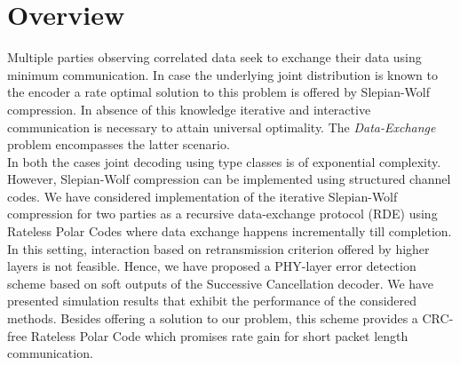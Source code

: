 \documentclass[
11pt, %
a4paper, %
oneside, %
headinclude,footinclude, %
BCOR5mm, %
]{scrartcl}
\begin{document}
\section*{Overview}
Multiple parties observing correlated data seek to exchange their data using minimum communication. In case the underlying joint distribution is known to the encoder a rate optimal solution to this problem is offered by Slepian-Wolf compression. In absence of this knowledge iterative and interactive communication is necessary to attain universal optimality. The \emph{Data-Exchange} problem  encompasses the latter scenario. \\In both the cases joint decoding using type classes is of exponential complexity. However, Slepian-Wolf compression can be implemented using structured channel codes. We have considered implementation of the iterative Slepian-Wolf compression for two parties as a recursive data-exchange protocol (RDE)  using Rateless Polar Codes where data exchange happens incrementally till completion. \\In this setting, interaction based on retransmission criterion offered by higher layers is not feasible.
Hence, we have  proposed a PHY-layer error detection scheme based on soft outputs of the Successive Cancellation decoder. We have presented simulation results that exhibit the performance of the considered methods.
Besides offering a solution to our problem, this scheme provides a CRC-free Rateless Polar Code which promises rate gain for short packet length communication.

\newpage
\end{document}
